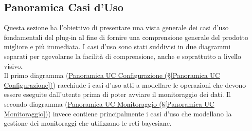 \pagebreak

\subsection{Panoramica Casi d'Uso}\label{PanoramicaUC}
Questa sezione ha l'obiettivo di presentare una vista generale dei casi d'uso fondamentali del plug-in al fine di fornire una comprensione generale del prodotto migliore e più immediata. I casi d'uso sono stati suddivisi in due diagrammi separati per agevolarne la facilità di comprensione, anche e soprattutto a livello visivo.\\
Il primo diagramma (\hyperref[Panoramica UC Configurazione]{Panoramica UC Configurazione (§\ref*{Panoramica UC Configurazione})}) racchiude i casi d'uso atti a modellare le operazioni che devono essere eseguite dall'utente prima di poter avviare il monitoraggio dei dati. Il secondo diagramma (\hyperref[Panoramica UC Monitoraggio]{Panoramica UC Monitoraggio (§\ref*{Panoramica UC Monitoraggio})}) invece contiene principalmente i casi d'uso che modellano la gestione dei monitoraggi che utilizzano le reti bayesiane.

